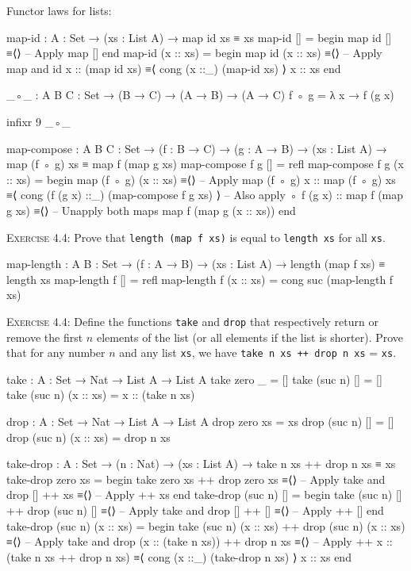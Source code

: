 \documentclass{article}
\begin{document}
\noindent
Functor laws for lists:

\begin{code}
map-id : { A : Set } → (xs : List A) → map id xs ≡ xs
map-id [] =
  begin
    map id []
  ≡⟨⟩ -- Apply map
    []
  end
map-id (x :: xs) =
  begin
    map id (x :: xs)
  ≡⟨⟩ -- Apply map and id
    x :: (map id xs)
  ≡⟨ cong (x ::_) (map-id xs) ⟩
    x :: xs
  end
\end{code}

\begin{code}
_◦_ : {A B C : Set} → (B → C) → (A → B) → (A → C)
f ◦ g = λ x → f (g x)

infixr 9 _◦_

map-compose : {A B C : Set} → (f : B → C) → (g : A → B)
    → (xs : List A) → map (f ◦ g) xs ≡ map f (map g xs)
map-compose f g [] = refl
map-compose f g (x :: xs) =
  begin
    map (f ◦ g) (x :: xs)
  ≡⟨⟩ -- Apply map
    (f ◦ g) x :: map (f ◦ g) xs
  ≡⟨ cong (f (g x) ::_) (map-compose f g xs) ⟩ -- Also apply ◦
    f (g x) :: map f (map g xs)
  ≡⟨⟩ -- Unapply both maps
    map f (map g (x :: xs))
  end
\end{code}

\noindent
\textsc{Exercise 4.4}: Prove that \verb!length (map f xs)! is equal to \verb!length xs! for all \verb!xs!.

\begin{code}
map-length : {A B : Set} → (f : A → B) → (xs : List A)
    → length (map f xs) ≡ length xs
map-length f [] = refl
map-length f (x :: xs) = cong suc (map-length f xs)
\end{code}

\noindent
\textsc{Exercise 4.4}: Define the functions \texttt{take} and \texttt{drop} that respectively return or remove the first $n$ elements of the list (or all elements if the list is shorter). Prove that for any number $n$ and any list \verb!xs!, we have \verb!take n xs ++ drop n xs! = \verb!xs!.

\begin{code}
take : {A : Set} → Nat → List A → List A
take zero _ = []
take (suc n) [] = []
take (suc n) (x :: xs) = x :: (take n xs)

drop : {A : Set} → Nat → List A → List A
drop zero xs = xs
drop (suc n) [] = []
drop (suc n) (x :: xs) = drop n xs
\end{code}

\begin{code}
take-drop : {A : Set} → (n : Nat) → (xs : List A)
    → take n xs ++ drop n xs ≡ xs
take-drop zero xs =
  begin
    take zero xs ++ drop zero xs
  ≡⟨⟩ -- Apply take and drop
    [] ++ xs
  ≡⟨⟩ -- Apply ++
    xs
  end
take-drop (suc n) [] =
  begin
    take (suc n) [] ++ drop (suc n) []
  ≡⟨⟩ -- Apply take and drop
    [] ++ []
  ≡⟨⟩ -- Apply ++
    []
  end
take-drop (suc n) (x :: xs) =
  begin
    take (suc n) (x :: xs) ++ drop (suc n) (x :: xs)
  ≡⟨⟩ -- Apply take and drop
    (x :: (take n xs)) ++ drop n xs
  ≡⟨⟩ -- Apply ++
    x :: (take n xs ++ drop n xs)
  ≡⟨ cong (x ::_) (take-drop n xs) ⟩
    x :: xs
  end
\end{code}
\end{document}
